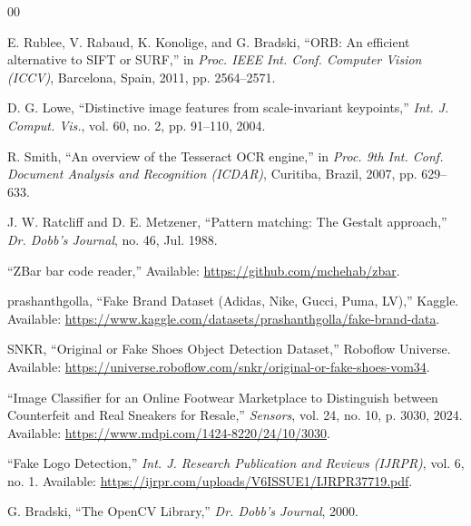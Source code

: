 \documentclass[conference]{IEEEtran}
\begin{document}
\begin{thebibliography}{00}
\setlength{\itemsep}{0pt}
\setlength{\parsep}{0pt}

E. Rublee, V. Rabaud, K. Konolige, and G. Bradski, ``ORB: An efficient alternative to SIFT or SURF,'' in \textit{Proc. IEEE Int. Conf. Computer Vision (ICCV)}, Barcelona, Spain, 2011, pp. 2564--2571.

D. G. Lowe, ``Distinctive image features from scale-invariant keypoints,'' \textit{Int. J. Comput. Vis.}, vol. 60, no. 2, pp. 91--110, 2004.

R. Smith, ``An overview of the Tesseract OCR engine,'' in \textit{Proc. 9th Int. Conf. Document Analysis and Recognition (ICDAR)}, Curitiba, Brazil, 2007, pp. 629--633.

J. W. Ratcliff and D. E. Metzener, ``Pattern matching: The Gestalt approach,'' \textit{Dr. Dobb's Journal}, no. 46, Jul. 1988.

``ZBar bar code reader,'' Available: \url{https://github.com/mchehab/zbar}.

prashanthgolla, ``Fake Brand Dataset (Adidas, Nike, Gucci, Puma, LV),'' Kaggle. Available: \url{https://www.kaggle.com/datasets/prashanthgolla/fake-brand-data}.

SNKR, ``Original or Fake Shoes Object Detection Dataset,'' Roboflow Universe. Available: \url{https://universe.roboflow.com/snkr/original-or-fake-shoes-vom34}.

``Image Classifier for an Online Footwear Marketplace to Distinguish between Counterfeit and Real Sneakers for Resale,'' \textit{Sensors}, vol. 24, no. 10, p. 3030, 2024. Available: \url{https://www.mdpi.com/1424-8220/24/10/3030}.

``Fake Logo Detection,'' \textit{Int. J. Research Publication and Reviews (IJRPR)}, vol. 6, no. 1. Available: \url{https://ijrpr.com/uploads/V6ISSUE1/IJRPR37719.pdf}.

G. Bradski, ``The OpenCV Library,'' \textit{Dr. Dobb's Journal}, 2000.

\end{thebibliography}
\end{document}
